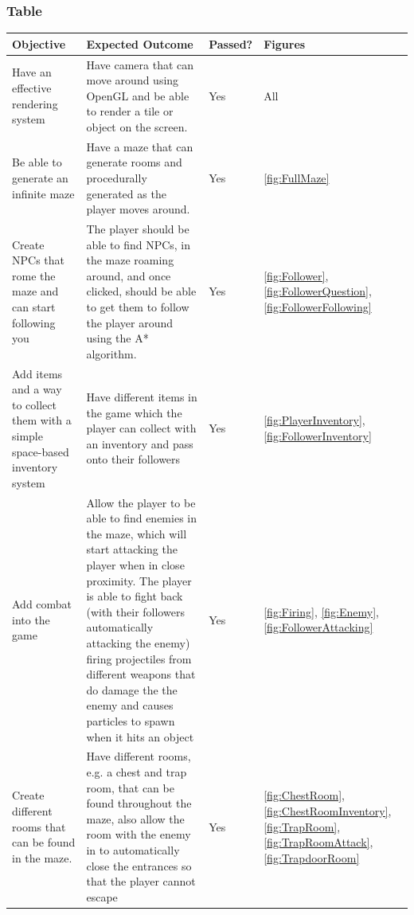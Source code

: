 \documentclass[../Main.tex]{subfiles}
\begin{document}
        \subsubsection{Table}
            \begin{center}
                \begin{tabular}{ | m{} | m{} | m{} | m{} | }
                    \hline
                    \textbf{Objective} & \textbf{Expected Outcome} & \textbf{Passed?} & \textbf{Figures} \\
                    \hline
                    Have an effective rendering system & Have camera that can move around using OpenGL and be able to render a tile or object on the screen. & Yes & All \\
                    \hline
                    Be able to generate an infinite maze & Have a maze that can generate rooms and procedurally generated as the player moves around. & Yes & \ref{fig:FullMaze}\\
                    \hline
                    Create NPCs that rome the maze and can start following you & The player should be able to find NPCs, in the maze roaming around, and once clicked, should be able to get them to follow the player around using the A* algorithm. & Yes & \ref{fig:Follower}, \ref{fig:FollowerQuestion}, \ref{fig:FollowerFollowing} \\
                    \hline
                    Add items and a way to collect them with a simple space-based inventory system & Have different items in the game which the player can collect with an inventory and pass onto their followers & Yes & \ref{fig:PlayerInventory}, \ref{fig:FollowerInventory} \\
                    \hline
                    Add combat into the game & Allow the player to be able to find enemies in the maze, which will start attacking the player when in close proximity. The player is able to fight back (with their followers automatically attacking the enemy) firing projectiles from different weapons that do damage the the enemy and causes particles to spawn when it hits an object & Yes & \ref{fig:Firing}, \ref{fig:Enemy}, \ref{fig:FollowerAttacking} \\
                    \hline
                    Create different rooms that can be found in the maze. &  Have different rooms, e.g. a chest and trap room, that can be found throughout the maze, also allow the room with the enemy in to automatically close the entrances so that the player cannot escape & Yes & \ref{fig:ChestRoom}, \ref{fig:ChestRoomInventory}, \ref{fig:TrapRoom}, \ref{fig:TrapRoomAttack}, \ref{fig:TrapdoorRoom} \\

\end{tabular}
\end{center}
\end{document}
